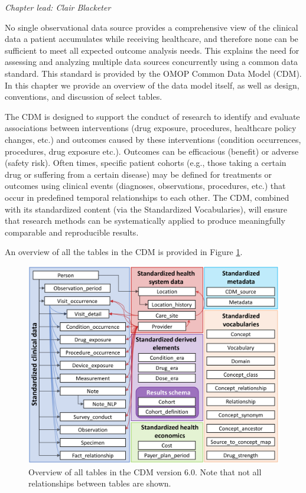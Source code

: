\documentclass[11pt]{book}
\theoremstyle{definition}
\theoremstyle{definition}
\theoremstyle{definition}
\theoremstyle{remark}
\begin{document}
\emph{Chapter lead: Clair Blacketer}

No single observational data source provides a comprehensive view of the clinical data a patient accumulates while receiving healthcare, and therefore none can be sufficient to meet all expected outcome analysis needs. This explains the need for assessing and analyzing multiple data sources concurrently using a common data standard. This standard is provided by the OMOP Common Data Model (CDM). In this chapter we provide an overview of the data model itself, as well as design, conventions, and discussion of select tables.

The CDM is designed to support the conduct of research to identify and evaluate associations between interventions (drug exposure, procedures, healthcare policy changes, etc.) and outcomes caused by these interventions (condition occurrences, procedures, drug exposure etc.). Outcomes can be efficacious (benefit) or adverse (safety risk). Often times, specific patient cohorts (e.g., those taking a certain drug or suffering from a certain disease) may be defined for treatments or outcomes using clinical events (diagnoses, observations, procedures, etc.) that occur in predefined temporal relationships to each other. The CDM, combined with its standardized content (via the Standardized Vocabularies), will ensure that research methods can be systematically applied to produce meaningfully comparable and reproducible results.

An overview of all the tables in the CDM is provided in Figure \ref{fig:cdmDiagram}.

\begin{figure}
\includegraphics[width=1\linewidth]{images/CommonDataModel/cdmDiagram} \caption{Overview of all tables in the CDM version 6.0. Note that not all relationships between tables are shown.}\label{fig:cdmDiagram}
\end{figure}
\end{document}
